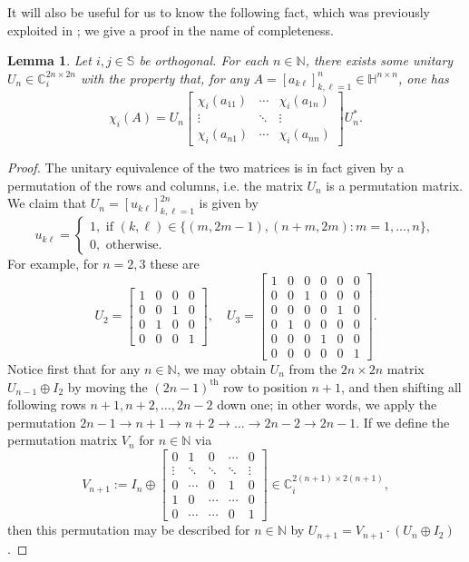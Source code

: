 \documentclass[11pt,reqno]{amsart}
\def\x{\chi}
\def\NN{\mathbb{N}}
\def\CC{\mathbb{C}}
\def\SS{\mathbb{S}}
\def\HH{\mathbb{H}}
\newtheorem{lemma}[theorem]{Lemma}
\theoremstyle{definition}
\numberwithin{equation}{section}
\begin{document}
It will also be useful for us to know the following fact, which was previously exploited in \cite{ACKS15}; we give a proof in the name of completeness.
\begin{lemma}
    \label{lem:UnitaryEquiv}
    Let \(i,j \in \SS\) be orthogonal. For each \(n\in\NN\), there exists some unitary \(U_n \in \CC_i^{2n \times 2n}\) with the property that, for any \(A = [a_{k\ell}]_{k,\ell=1}^n \in \HH^{n\times n}\), one has 
    \[
        \x_i(A) = U_n \begin{bmatrix} \x_i(a_{11}) & \cdots & \x_i(a_{1n}) \\ \vdots & \ddots & \vdots \\ \x_i(a_{n1}) & \cdots & \x_i(a_{nn}) \end{bmatrix} U_n^*.
    \]
\end{lemma}
\begin{proof}
    The unitary equivalence of the two matrices is in fact given by a permutation of the rows and columns, i.e. the matrix \(U_n\) is a permutation matrix. We claim that \(U_n = [u_{k\ell}]_{k,\ell=1}^{2n}\) is given by
    \[
        u_{k\ell} = \begin{cases}1, \text{ if } (k, \ell) \in \{(m, 2m-1), (n+m, 2m) : m = 1, \ldots, n\}, \\ 0, \text{ otherwise}.\end{cases}
    \]
    For example, for \(n = 2,3\) these are
    \[
        U_2 = \begin{bmatrix} 1 & 0 & 0 & 0 \\ 0 & 0 & 1 & 0 \\ 0 & 1 & 0 & 0 \\ 0 & 0 & 0 & 1 \end{bmatrix}, \quad U_3 = \begin{bmatrix} 1 & 0 & 0 & 0 & 0 & 0 \\ 0 & 0 & 1 & 0 & 0 & 0 \\ 0 & 0 & 0 & 0 & 1 & 0 \\ 0 & 1 & 0 & 0 & 0 & 0 \\ 0 & 0 & 0 & 1 & 0 & 0 \\ 0 & 0 & 0 & 0 & 0 & 1 \end{bmatrix}.
    \]
    Notice first that for any \(n \in \NN\), we may obtain \(U_{n}\) from the \(2n \times 2n\) matrix \(U_{n-1} \oplus I_2\) by moving the \((2n-1)^{\text{th}}\) row to position \(n+1\), and then shifting all following rows \(n+1, n+2, \ldots, 2n-2\) down one; in other words, we apply the permutation \(2n-1 \to n+1 \to n+2 \to \ldots \to 2n-2 \to 2n-1\). If we define the permutation matrix \(V_n\) for \(n \in \NN\) via
    \[
        V_{n+1} := I_{n} \oplus \begin{bmatrix} 0 & 1 & 0 & \cdots & 0 \\ \vdots & \ddots & \ddots & \ddots & \vdots \\ 0 & \cdots & 0 & 1 & 0 \\ 1 & 0 & \cdots & \cdots & 0 \\ 0 & \cdots & \cdots & 0 & 1 \end{bmatrix} \in \CC_i^{2(n+1) \times 2(n+1)},
    \]
    then this permutation may be described for \(n \in \NN\) by \(U_{n+1} = V_{n+1} \cdot (U_n \oplus I_2)\).
    

\end{proof}
\end{document}
